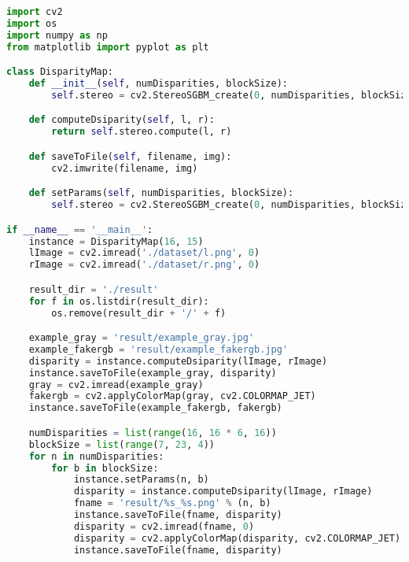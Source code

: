 \begin{lstlisting}[language=Python]import cv2
import os
import numpy as np
from matplotlib import pyplot as plt

class DisparityMap:
    def __init__(self, numDisparities, blockSize):
        self.stereo = cv2.StereoSGBM_create(0, numDisparities, blockSize)

    def computeDsiparity(self, l, r):
        return self.stereo.compute(l, r)

    def saveToFile(self, filename, img):
        cv2.imwrite(filename, img)

    def setParams(self, numDisparities, blockSize):
        self.stereo = cv2.StereoSGBM_create(0, numDisparities, blockSize)

if __name__ == '__main__':
    instance = DisparityMap(16, 15)
    lImage = cv2.imread('./dataset/l.png', 0)
    rImage = cv2.imread('./dataset/r.png', 0)

    result_dir = './result'
    for f in os.listdir(result_dir):
        os.remove(result_dir + '/' + f)

    example_gray = 'result/example_gray.jpg'
    example_fakergb = 'result/example_fakergb.jpg'
    disparity = instance.computeDsiparity(lImage, rImage)
    instance.saveToFile(example_gray, disparity)
    gray = cv2.imread(example_gray)
    fakergb = cv2.applyColorMap(gray, cv2.COLORMAP_JET)
    instance.saveToFile(example_fakergb, fakergb)

    numDisparities = list(range(16, 16 * 6, 16))
    blockSize = list(range(7, 23, 4))
    for n in numDisparities:
        for b in blockSize:
            instance.setParams(n, b)
            disparity = instance.computeDsiparity(lImage, rImage)
            fname = 'result/%s_%s.png' % (n, b)
            instance.saveToFile(fname, disparity)
            disparity = cv2.imread(fname, 0)
            disparity = cv2.applyColorMap(disparity, cv2.COLORMAP_JET)
            instance.saveToFile(fname, disparity)
\end{lstlisting}